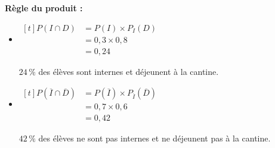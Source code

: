 \documentclass[10pt,a4paper]{article}
\begin{document}
\begin{bloc}
\textbf{Règle du produit :}
\begin{itemize}
    \item \(\begin{aligned}[t] P(I\cap D)&=P(I)\times P_I(D)\\ &=0{,}3\times 0{,}8\\ &=0{,}24\end{aligned}\)

    \(24\,\%\) des élèves sont internes et déjeunent à la cantine.
    \item \(\begin{aligned}[t] P(\overline{I}\cap\overline{D})&=P(\overline{I})\times P_{\overline{I}}(\overline{D})\\ &=0{,}7\times 0{,}6\\ &=0{,}42\end{aligned}\)

    \(42\,\%\) des élèves ne sont pas internes et ne déjeunent pas à la cantine.
\end{itemize}
\end{bloc}
\end{document}
